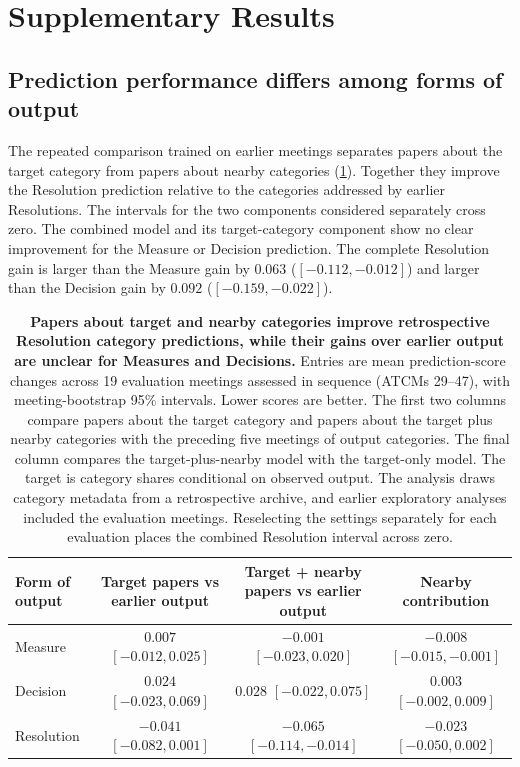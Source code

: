 \documentclass{fun_article}
\begin{document}
\section{Supplementary Results}
\subsection{Prediction performance differs among forms of output}\label{sec:forecast-results}
The repeated comparison trained on earlier meetings separates papers about the target category from papers about nearby categories (\cref{tab:output-forecast-scores}). Together they improve the Resolution prediction relative to the categories addressed by earlier Resolutions. The intervals for the two components considered separately cross zero. The combined model and its target-category component show no clear improvement for the Measure or Decision prediction. The complete Resolution gain is larger than the Measure gain by $0.063$ ($[-0.112,-0.012]$) and larger than the Decision gain by $0.092$ ($[-0.159,-0.022]$).

\begin{table}[!htbp]
\centering
\scriptsize
\caption{\textbf{Papers about target and nearby categories improve retrospective Resolution category predictions, while their gains over earlier output are unclear for Measures and Decisions.} Entries are mean prediction-score changes across 19 evaluation meetings assessed in sequence (ATCMs 29--47), with meeting-bootstrap 95\% intervals. Lower scores are better. The first two columns compare papers about the target category and papers about the target plus nearby categories with the preceding five meetings of output categories. The final column compares the target-plus-nearby model with the target-only model. The target is category shares conditional on observed output. The analysis draws category metadata from a retrospective archive, and earlier exploratory analyses included the evaluation meetings. Reselecting the settings separately for each evaluation places the combined Resolution interval across zero.}
\label{tab:output-forecast-scores}
\begin{tabular}{@{}lccc@{}}
\toprule
Form of output & Target papers vs earlier output & Target + nearby papers vs earlier output & Nearby contribution \\
\midrule
Measure & $0.007$ $[-0.012,0.025]$ & $-0.001$ $[-0.023,0.020]$ & $-0.008$ $[-0.015,-0.001]$ \\
Decision & $0.024$ $[-0.023,0.069]$ & $0.028$ $[-0.022,0.075]$ & $0.003$ $[-0.002,0.009]$ \\
Resolution & $-0.041$ $[-0.082,0.001]$ & $-0.065$ $[-0.114,-0.014]$ & $-0.023$ $[-0.050,0.002]$ \\
\bottomrule
\end{tabular}
\end{table}
\end{document}

